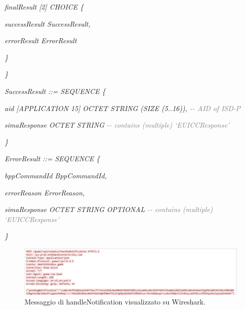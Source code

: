 \documentclass[10pt, oneside]{book}
\begin{document}
\hspace{0.75cm} \textit{finalResult [2] CHOICE \{}

\hspace{1.5cm} \textit{successResult SuccessResult,}

\hspace{1.5cm} \textit{errorResult ErrorResult}

\hspace{0.75cm} \textit{\}}

\textit{\}\\}

\textit{SuccessResult ::= SEQUENCE \{}

\hspace{0.75cm} \textit{aid [APPLICATION 15] OCTET STRING (SIZE (5..16)), \textcolor{gray}{{-}{-} AID of ISD-P}}

\hspace{0.75cm} \textit{simaResponse OCTET STRING \textcolor{gray}{{-}{-} contains (multiple) `EUICCResponse'}}

\textit{\}\\}

\textit{ErrorResult ::= SEQUENCE \{}

\hspace{0.75cm} \textit{bppCommandId BppCommandId,}

\hspace{0.75cm} \textit{errorReason ErrorReason,}

\hspace{0.75cm} \textit{simaResponse OCTET STRING OPTIONAL \textcolor{gray}{{-}{-} contains (multiple) `EUICCResponse'}}

\textit{\}\\}

\begin{figure}
\includegraphics[width=\linewidth]{msg7-stream-pcap.png}
\caption{Messaggio di handleNotification visualizzato su Wireshark.}
\label{fig:msg7-stream-pcap}
\end{figure}
\end{document}

